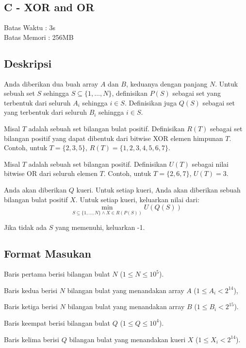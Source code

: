 \documentclass{article}
\begin{document}
\begin{center}
    \section*{C - XOR and OR} %
    Batas Waktu : 3s \\  %
    Batas Memori :  256MB \\ %
\end{center}

\subsection*{Deskripsi}

Anda diberikan dua buah array $A$ dan $B$, keduanya dengan panjang $N$. Untuk sebuah set $S$ sehingga $S \subseteq \{1, \dots, N\}$, definisikan $P(S)$ sebagai set yang terbentuk dari seluruh $A_i$ sehingga $i \in S$. Definisikan juga $Q(S)$ sebagai set yang terbentuk dari seluruh $B_i$ sehingga $i \in S$. 

Misal $T$ adalah sebuah set bilangan bulat positif. Definisikan $R(T)$ sebagai set bilangan positif yang dapat dibentuk dari bitwise XOR elemen himpunan $T$. Contoh, untuk $T = \{2, 3, 5 \}$, $R(T)= \{1,2,3,4,5,6,7\}$. 

Misal $T$ adalah sebuah set bilangan positif. Definisikan $U(T)$ sebagai nilai bitwise OR dari seluruh elemen $T$. Contoh, untuk $T = \{2, 6, 7 \}$, $U(T)= 3$. 

Anda akan diberikan $Q$ kueri. Untuk setiap kueri, Anda akan diberikan sebuah bilangan bulat positif $X$. Untuk setiap kueri, keluarkan nilai dari:
\[
  \min_{S \subseteq \{1, \dots, N \} \wedge X \in R(P(S))} U(Q(S))
\]

Jika tidak ada $S$ yang memenuhi, keluarkan -1.

\subsection*{Format Masukan}
Baris pertama berisi bilangan bulat $N$ ($1 \leq N \leq  10^5 $).

Baris kedua berisi $N$ bilangan bulat yang menandakan array $A$ ($1 \leq A_i < 2^{14}$),

Baris ketiga berisi $N$ bilangan bulat yang menandakan array $B$ ($1 \leq B_i < 2^{15}$).

Baris keempat berisi bilangan bulat $Q$ ($1 \leq Q \leq 10^4$).

Baris kelima berisi $Q$ bilangan bulat yang menandakan kueri $X$ ($1 \leq X_i < 2^{14}$). 
\end{document}
